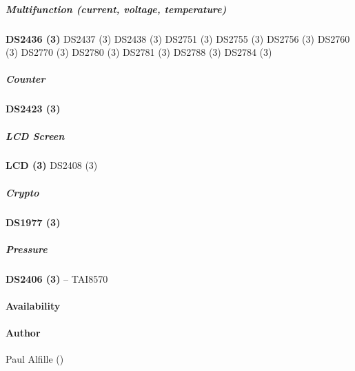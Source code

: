 \subparagraph*{Multifunction (current, voltage, temperature)}\textsf{\textbf{DS2436 (3)} \textsf{DS2437 (3)} \textsf{DS2438
(3)} \textsf{DS2751 (3)} \textsf{DS2755 (3)} \textsf{DS2756 (3)} \textsf{DS2760 (3)} \textsf{DS2770 (3)} \textsf{DS2780 (3)} \textsf{DS2781
(3)} \textsf{DS2788 (3)} \textsf{DS2784 (3)}} 
\subparagraph*{Counter}\textsf{\textbf{DS2423 (3)}} 
\subparagraph*{LCD Screen}\textsf{\textbf{LCD (3)} \textsf{DS2408 (3)}}

\subparagraph*{Crypto}\textsf{\textbf{DS1977 (3)}} 
\subparagraph*{Pressure}\textsf{\textbf{DS2406 (3)} -- TAI8570}  
\paragraph*{Availability}

\paragraph*{Author}
Paul Alfille () 
